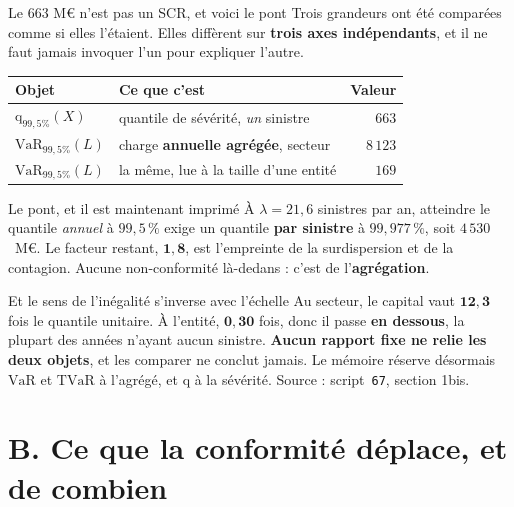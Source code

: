 \documentclass[11pt]{beamer}
\begin{document}
\begin{frame}{Le \texorpdfstring{$663$}{663} M\euro{} n'est pas un SCR, et voici le pont}
\scriptsize
Trois grandeurs ont été comparées comme si elles l'étaient. Elles diffèrent sur \textbf{trois
axes indépendants}, et il ne faut jamais invoquer l'un pour expliquer l'autre.
\vspace{-1mm}
\begin{center}\scriptsize
\begin{tabular}{@{}l l r@{}}
\toprule
\textbf{Objet} & \textbf{Ce que c'est} & \textbf{Valeur} \\
\midrule
$\mathrm{q}_{99{,}5\%}(X)$ & quantile de sévérité, \emph{un} sinistre & $663$ \\
$\mathrm{VaR}_{99{,}5\%}(L)$ & charge \textbf{annuelle agrégée}, secteur & $8\,123$ \\
$\mathrm{VaR}_{99{,}5\%}(L)$ & la même, lue à la taille d'une entité & $169$ \\
\bottomrule
\end{tabular}
\end{center}
\vspace{-1mm}
\begin{block}{Le pont, et il est maintenant imprimé}
À $\lambda=21{,}6$ sinistres par an, atteindre le quantile \emph{annuel} à $99{,}5\,\%$ exige un
quantile \textbf{par sinistre} à $99{,}977\,\%$, soit $4\,530$~M\euro. Le facteur restant,
$\mathbf{1{,}8}$, est l'empreinte de la surdispersion et de la contagion. Aucune non-conformité
là-dedans : c'est de l'\textbf{agrégation}.
\end{block}
\vspace{-1mm}
\begin{block}{Et le sens de l'inégalité s'inverse avec l'échelle}
Au secteur, le capital vaut $\mathbf{12{,}3}$ fois le quantile unitaire. À l'entité,
$\mathbf{0{,}30}$ fois, donc il passe \textbf{en dessous}, la plupart des années n'ayant aucun
sinistre. \textbf{Aucun rapport fixe ne relie les deux objets}, et les comparer ne conclut
jamais. Le mémoire réserve désormais $\mathrm{VaR}$ et $\mathrm{TVaR}$ à l'agrégé, et
$\mathrm{q}$ à la sévérité. Source : script~\texttt{67}, section 1bis.
\end{block}
\end{frame}


\section*{B. Ce que la conformité déplace, et de combien}
\end{document}
